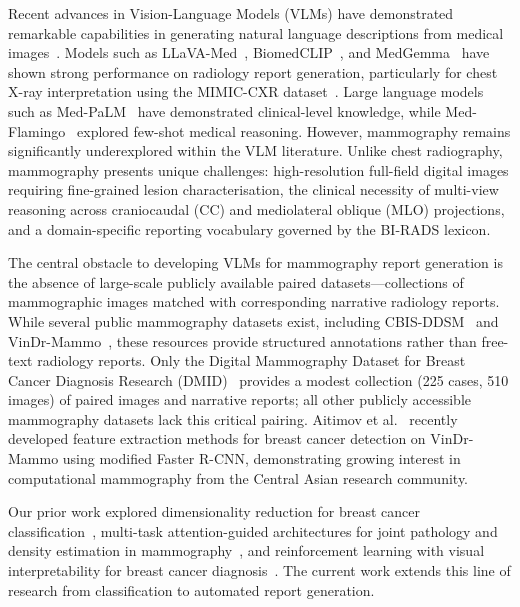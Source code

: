 \documentclass{wlscirep}
\begin{document}
Recent advances in Vision-Language Models (VLMs) have demonstrated remarkable capabilities in generating natural language descriptions from medical images~\cite{wang2024mllm_survey}. Models such as LLaVA-Med~\cite{li2024llavamed}, BiomedCLIP~\cite{zhang2023biomedclip}, and MedGemma~\cite{lin2024medgemma} have shown strong performance on radiology report generation, particularly for chest X-ray interpretation using the MIMIC-CXR dataset~\cite{johnson2019mimiccxr}. Large language models such as Med-PaLM~\cite{singhal2023medpalm} have demonstrated clinical-level knowledge, while Med-Flamingo~\cite{moor2023medflamingo} explored few-shot medical reasoning. However, mammography remains significantly underexplored within the VLM literature. Unlike chest radiography, mammography presents unique challenges: high-resolution full-field digital images requiring fine-grained lesion characterisation, the clinical necessity of multi-view reasoning across craniocaudal (CC) and mediolateral oblique (MLO) projections, and a domain-specific reporting vocabulary governed by the BI-RADS lexicon.

The central obstacle to developing VLMs for mammography report generation is the absence of large-scale publicly available paired datasets---collections of mammographic images matched with corresponding narrative radiology reports. While several public mammography datasets exist, including CBIS-DDSM~\cite{lee2017curated} and VinDr-Mammo~\cite{nguyen2023vindr}, these resources provide structured annotations rather than free-text radiology reports. Only the Digital Mammography Dataset for Breast Cancer Diagnosis Research (DMID)~\cite{oza2024} provides a modest collection (225 cases, 510 images) of paired images and narrative reports; all other publicly accessible mammography datasets lack this critical pairing. Aitimov et al.~\cite{aitimov2025feature} recently developed feature extraction methods for breast cancer detection on VinDr-Mammo using modified Faster R-CNN, demonstrating growing interest in computational mammography from the Central Asian research community.

Our prior work explored dimensionality reduction for breast cancer classification~\cite{esen2024pca}, multi-task attention-guided architectures for joint pathology and density estimation in mammography~\cite{esen2025multitask}, and reinforcement learning with visual interpretability for breast cancer diagnosis~\cite{esen2025rl}. The current work extends this line of research from classification to automated report generation.
\end{document}
